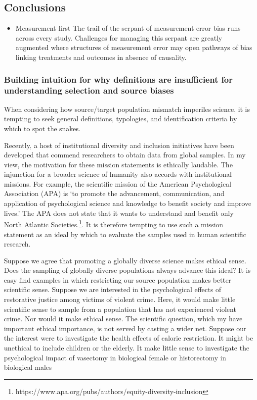 \documentclass[
  single column]{article}
\providecommand{\tightlist}{%
  \setlength{\itemsep}{0pt}\setlength{\parskip}{0pt}}\usepackage{longtable,booktabs,array}
\begin{document}
\subsection{Conclusions}\label{conclusions}

\begin{itemize}
\tightlist
\item
  Measurement first The trail of the serpant of measurement error bias
  runs across every study. Challenges for managing this serpant are
  greatly augmented where structures of measurement error may open
  pathways of bias linking treatments and outcomes in absence of
  causality.
\end{itemize}

\subsubsection{Building intuition for why definitions are insufficient
for understanding selection and source
biases}\label{building-intuition-for-why-definitions-are-insufficient-for-understanding-selection-and-source-biases}

When considering how source/target population mismatch imperiles
science, it is tempting to seek general definitions, typologies, and
identification criteria by which to spot the snakes.

Recently, a host of institutional diversity and inclusion initiatives
have been developed that commend researchers to obtain data from global
samples. In my view, the motivation for these mission statements is
ethically laudable. The injunction for a broader science of humanity
also accords with institutional missions. For example, the scientific
mission of the American Psychological Association (APA) is `to promote
the advancement, communication, and application of psychological science
and knowledge to benefit society and improve lives.' The APA does not
state that it wants to understand and benefit only North Atlantic
Societies.\footnote{https://www.apa.org/pubs/authors/equity-diversity-inclusion}.
It is therefore tempting to use such a mission statement as an ideal by
which to evaluate the samples used in human scientific research.

Suppose we agree that promoting a globally diverse science makes ethical
sense. Does the sampling of globally diverse populations always advance
this ideal? It is easy find examples in which restricting our source
population makes better scientific sense. Suppose we are interested in
the psychological effects of restorative justice among victims of
violent crime. Here, it would make little scientific sense to sample
from a population that has not experienced violent crime. Nor would it
make ethical sense. The scientific question, which my have important
ethical importance, is not served by casting a wider net. Suppose our
the interest were to investigate the health effects of calorie
restriction. It might be unethical to include children or the elderly.
It make little sense to investigate the psychological impact of
vasectomy in biological female or historectomy in biological males
\end{document}
